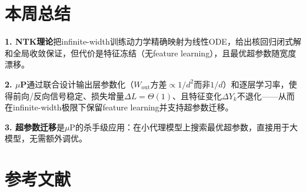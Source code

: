 \documentclass[11pt,a4paper]{article}
\begin{document}
\section{本周总结}

\begin{tcolorbox}[colback=yellow!10,colframe=yellow!60!black,title=\textbf{三句话总结}]
\textbf{1. NTK理论}把infinite-width训练动力学精确映射为线性ODE，给出核回归闭式解和全局收敛保证，但代价是特征冻结（无feature learning），且最优超参数随宽度漂移。

\textbf{2. $\mu$P}通过联合设计输出层参数化（$W_{\text{out}}$方差$\propto 1/d^2$而非$1/d$）和逐层学习率，使得前向/反向信号稳定、损失增量$\Delta L=\Theta(1)$、且特征变化$\Delta Y_k$不退化——从而在infinite-width极限下保留feature learning并支持超参数迁移。

\textbf{3. 超参数迁移}是$\mu$P的杀手级应用：在小代理模型上搜索最优超参数，直接用于大模型，无需额外调优。
\end{tcolorbox}


\section*{参考文献}
\end{document}
